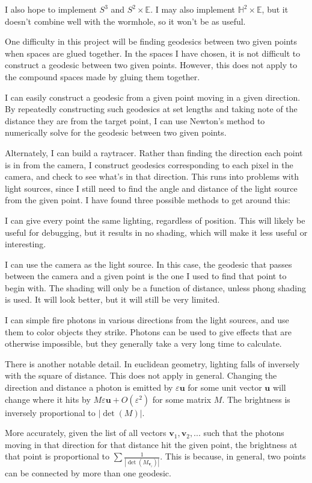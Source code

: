 \documentclass[12pt]{amsart}
\begin{document}
I also hope to implement $S^3$ and $S^2 \times \mathbb{E}$. I may also implement $\mathbb{H}^2 \times \mathbb{E}$, but it doesn't combine well with the wormhole, so it won't be as useful.


One difficulty in this project will be finding geodesics between two given points when spaces are glued together. In the spaces I have chosen, it is not difficult to construct a geodesic between two given points. However, this does not apply to the compound spaces made by gluing them together.

I can easily construct a geodesic from a given point moving in a given direction. By repeatedly constructing such geodesics at set lengths and taking note of the distance they are from the target point, I can use Newton's method to numerically solve for the geodesic between two given points.

Alternately, I can build a raytracer. Rather than finding the direction each point is in from the camera, I construct geodesics corresponding to each pixel in the camera, and check to see what's in that direction. This runs into problems with light sources, since I still need to find the angle and distance of the light source from the given point. I have found three possible methods to get around this:

I can give every point the same lighting, regardless of position. This will likely be useful for debugging, but it results in no shading, which will make it less useful or interesting.

I can use the camera as the light source. In this case, the geodesic that passes between the camera and a given point is the one I used to find that point to begin with. The shading will only be a function of distance, unless phong shading is used. It will look better, but it will still be very limited.

I can simple fire photons in various directions from the light sources, and use them to color objects they strike. Photons can be used to give effects that are otherwise impossible, but they generally take a very long time to calculate.


There is another notable detail. In euclidean geometry, lighting falls of inversely with the square of distance. This does not apply in general. Changing the direction and distance a photon is emitted by $\varepsilon\textbf{u}$ for some unit vector $\textbf{u}$ will change where it hits by $M\varepsilon\textbf{u} + O(\varepsilon^2)$ for some matrix $M$. The brightness is inversely proportional to $|\det(M)|$.

More accurately, given the list of all vectors $\textbf{v}_1, \textbf{v}_2, ...$ such that the photons moving in that direction for that distance hit the given point, the brightness at that point is proportional to $\sum\frac{1}{|\det(M_{\textbf{v}_i})|}$. This is because, in general, two points can be connected by more than one geodesic.
\end{document}
